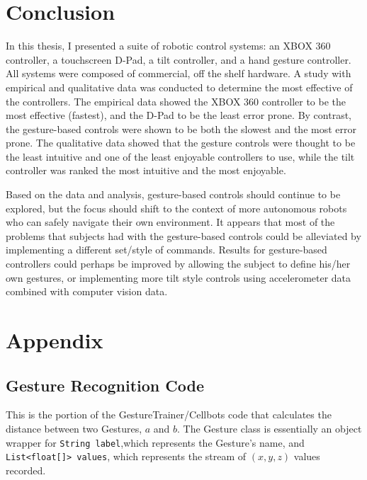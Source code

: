 \documentclass[12pt, letterpaper]{report}
\begin{document}
\chapter{Conclusion}
In this thesis, I presented a suite of robotic control systems: an XBOX 360 controller, a touchscreen D-Pad, a tilt controller, and a hand gesture controller. All systems were composed of commercial, off the shelf hardware. A study with empirical and qualitative data was conducted to determine the most effective of the controllers. The empirical data showed the XBOX 360 controller to be the most effective (fastest), and the D-Pad to be the least error prone. By contrast, the gesture-based controls were shown to be both the slowest and the most error prone. The qualitative data showed that the gesture controls were thought to be the least intuitive and one of the least enjoyable controllers to use, while the tilt controller was ranked the most intuitive and the most enjoyable. 

Based on the data and analysis, gesture-based controls should continue to be explored, but the focus should shift to the context of more autonomous robots who can safely navigate their own environment. It appears that most of the problems that subjects had with the gesture-based controls could be alleviated by implementing a different set/style of commands. Results for gesture-based controllers could perhaps be improved by allowing the subject to define his/her own gestures, or implementing more tilt style controls using accelerometer data combined with computer vision data.




\pagestyle{myheadings}
\markright{}
\chapter*{Appendix}
\section*{Gesture Recognition Code}
This is the portion of the GestureTrainer/Cellbots code that calculates the distance between two Gestures, $a$ and $b$. The Gesture class is essentially an object wrapper for \texttt{String label},which represents the Gesture's name, and \texttt{List<float[]> values}, which represents the stream of $(x, y, z)$ values recorded.

\singlespacing
{}

\end{document}
